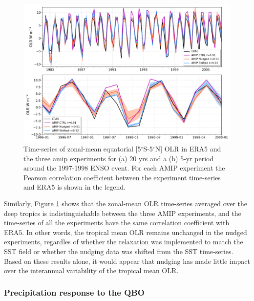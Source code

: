 \begin{figure}[t!]
\centering
 \includegraphics[width=\linewidth]{figures/olr_tseries.png}
\caption[Tropical mean OLR time series.]{Time-series of zonal-mean equatorial [5$^\circ$S-5$^\circ$N]  OLR in ERA5 and the three amip experiments for (a) 20 yrs and a (b) 5-yr period around the 1997-1998 ENSO event. For each AMIP experiment the Pearson correlation coefficient between the experiment time-series and ERA5 is shown in the legend. }
\label{fig:olramip_tseries}
\end{figure}

Similarly, Figure \ref{fig:olramip_tseries} shows that the zonal-mean OLR time-series averaged over the deep tropics is indistinguishable between the three AMIP experiments, and the time-series of all the experiments have the same correlation coefficient with ERA5. In other words, the tropical mean OLR remains unchanged in the nudged experiments, regardles of whether the relaxation was implemented to match the SST field or whether the nudging data was shifted from the SST time-series. 
Based on these results alone, it would appear that nudging has made little impact over the interannual variability of the tropical mean OLR. 


\subsubsection{Precipitation response to the QBO}

